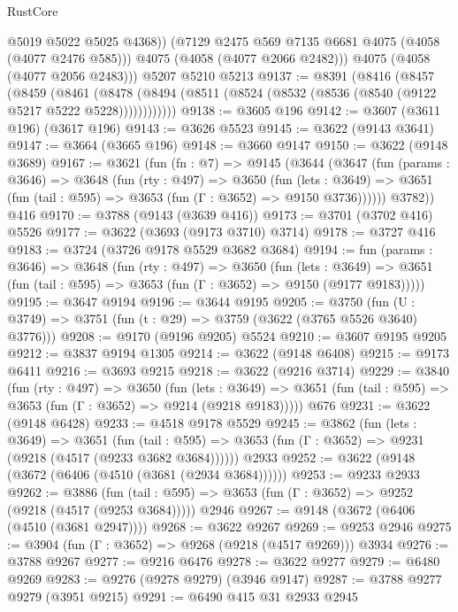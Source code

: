 \begin{lexlean}{RustCore}
\begin{coremodule}
            @5019
            @5022
            @5025
            @4368))
        (@7129 @2475 @569 @7135 @6681 @4075 (@4058 (@4077 @2476 @585)))
        @4075
        (@4058 (@4077 @2066 @2482)))
      @4075
      (@4058 (@4077 @2056 @2483)))
    @5207
    @5210
    @5213
@9137 := @8391
    (@8416
      (@8457
        (@8459
          (@8461
            (@8478 (@8494 (@8511 (@8524 (@8532 (@8536 (@8540 (@9122 @5217 @5222 @5228))))))))))))
@9138 := @3605 @196
@9142 := @3607 (@3611 @196) (@3617 @196)
@9143 := @3626 @5523
@9145 := @3622 (@9143 @3641)
@9147 := @3664 (@3665 @196)
@9148 := @3660 @9147
@9150 := @3622 (@9148 @3689)
@9167 := @3621
    (fun (fn : @7) =>
    @9145
      (@3644
        (@3647
          (fun (params : @3646) =>
          @3648
            (fun (rty : @497) =>
            @3650
              (fun (lets : @3649) =>
              @3651 (fun (tail : @595) => @3653 (fun (Γ : @3652) => @9150 @3736))))))
        @3782))
    @416
@9170 := @3788 (@9143 (@3639 @416))
@9173 := @3701 (@3702 @416) @5526
@9177 := @3622 (@3693 (@9173 @3710) @3714)
@9178 := @3727 @416
@9183 := @3724 (@3726 @9178 @5529 @3682 @3684)
@9194 := fun (params : @3646) =>
  @3648
    (fun (rty : @497) =>
    @3650
      (fun (lets : @3649) =>
      @3651 (fun (tail : @595) => @3653 (fun (Γ : @3652) => @9150 (@9177 @9183)))))
@9195 := @3647 @9194
@9196 := @3644 @9195
@9205 := @3750 (fun (U : @3749) => @3751 (fun (t : @29) => @3759 (@3622 (@3765 @5526 @3640) @3776)))
@9208 := @9170 (@9196 @9205) @5524
@9210 := @3607 @9195 @9205
@9212 := @3837 @9194 @1305
@9214 := @3622 (@9148 @6408)
@9215 := @9173 @6411
@9216 := @3693 @9215
@9218 := @3622 (@9216 @3714)
@9229 := @3840
    (fun (rty : @497) =>
    @3650
      (fun (lets : @3649) =>
      @3651 (fun (tail : @595) => @3653 (fun (Γ : @3652) => @9214 (@9218 @9183)))))
    @676
@9231 := @3622 (@9148 @6428)
@9233 := @4518 @9178 @5529
@9245 := @3862
    (fun (lets : @3649) =>
    @3651
      (fun (tail : @595) => @3653 (fun (Γ : @3652) => @9231 (@9218 (@4517 (@9233 @3682 @3684))))))
    @2933
@9252 := @3622 (@9148 (@3672 (@6406 (@4510 (@3681 (@2934 @3684))))))
@9253 := @9233 @2933
@9262 := @3886
    (fun (tail : @595) => @3653 (fun (Γ : @3652) => @9252 (@9218 (@4517 (@9253 @3684)))))
    @2946
@9267 := @9148 (@3672 (@6406 (@4510 (@3681 @2947))))
@9268 := @3622 @9267
@9269 := @9253 @2946
@9275 := @3904 (fun (Γ : @3652) => @9268 (@9218 (@4517 @9269))) @3934
@9276 := @3788 @9267
@9277 := @9216 @6476
@9278 := @3622 @9277
@9279 := @6480 @9269
@9283 := @9276 (@9278 @9279) (@3946 @9147)
@9287 := @3788 @9277 @9279 (@3951 @9215)
@9291 := @6490 @415 @31 @2933 @2945

\end{coremodule}
\end{lexlean}
